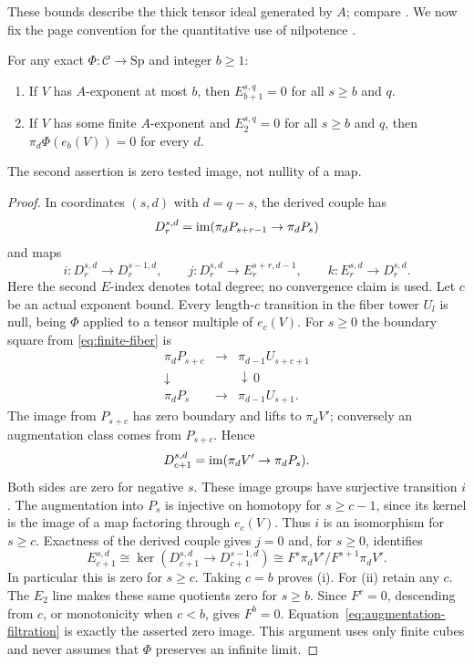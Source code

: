 These bounds describe the thick tensor ideal generated by $A$;
compare \cite[Definition~3.18]{mathew2016}. We now fix
the page convention for the quantitative use of nilpotence
\cite{mnn2017,mnn2019}.

\begin{proposition}\label{prop:pages}
For any exact $\Phi:\mathcal C\to\mathrm{Sp}$ and integer $b\geq1$:
\begin{enumerate}
\item If $V$ has $A$-exponent at most $b$, then $E_{b+1}^{s,q}=0$ for all
      $s\geq b$ and $q$.
\item If $V$ has some finite $A$-exponent and $E_2^{s,q}=0$ for all
      $s\geq b$ and $q$, then $\pi_d\Phi(e_b(V))=0$ for every $d$.
\end{enumerate}
The second assertion is zero tested image, not nullity of a map.
\end{proposition}
\begin{proof}
In coordinates $(s,d)$ with $d=q-s$, the derived couple has
\[
 D_r^{s,d}=\operatorname{im}(\pi_dP_{s+r-1}\to\pi_dP_s)
\]
and maps
\[
 i:D_r^{s,d}\to D_r^{s-1,d},\qquad
 j:D_r^{s,d}\to E_r^{s+r,d-1},\qquad
 k:E_r^{s,d}\to D_r^{s,d}.
\]
Here the second $E$-index denotes total degree; no convergence claim is used.
Let $c$ be an actual exponent bound. Every length-$c$ transition in the
fiber tower $U_l$ is null, being $\Phi$ applied to a tensor multiple
of $e_c(V)$. For $s\geq0$ the boundary square from
\eqref{eq:finite-fiber} is
\[
 \begin{array}{ccc}
 \pi_dP_{s+c}&\longrightarrow&\pi_{d-1}U_{s+c+1}\\
 \downarrow&&\downarrow\,0\\
 \pi_dP_s&\longrightarrow&\pi_{d-1}U_{s+1}.
 \end{array}
\]
The image from $P_{s+c}$ has zero boundary and lifts to $\pi_dV'$;
conversely an augmentation class comes from $P_{s+c}$. Hence
\begin{equation}\label{eq:stable-derived-image}
 D_{c+1}^{s,d}=\operatorname{im}(\pi_dV'\to\pi_dP_s).
\end{equation}
Both sides are zero for negative $s$. These image groups have surjective
transition $i$. The augmentation into $P_s$ is injective on homotopy for
$s\geq c-1$, since its kernel is the image of a map factoring through
$e_c(V)$. Thus $i$ is an isomorphism for $s\geq c$. Exactness of the
derived couple gives $j=0$ and, for $s\geq0$, identifies
\[
 E_{c+1}^{s,d}\cong\ker(D_{c+1}^{s,d}\to D_{c+1}^{s-1,d})
                   \cong F^s\pi_dV'/F^{s+1}\pi_dV'.
\]
In particular this is zero for $s\geq c$. Taking $c=b$ proves (i).
For (ii) retain any $c$. The $E_2$ line makes these same quotients zero for
$s\geq b$. Since $F^c=0$, descending from $c$, or monotonicity when
$c<b$, gives $F^b=0$. Equation~\eqref{eq:augmentation-filtration}
is exactly the asserted zero image. This argument uses only finite
cubes and never assumes that $\Phi$ preserves an infinite limit.
\end{proof}

